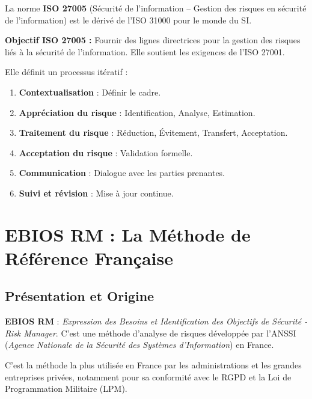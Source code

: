 La norme \textbf{ISO 27005} (Sécurité de l'information -- Gestion des risques en sécurité de l'information) est le dérivé de l'ISO 31000 pour le monde du SI.

\begin{boxdef}
\textbf{Objectif ISO 27005 :} Fournir des lignes directrices pour la gestion des risques liés à la sécurité de l'information. Elle soutient les exigences de l'ISO 27001.
\end{boxdef}

Elle définit un processus itératif :
\begin{enumerate}
    \item \textbf{Contextualisation} : Définir le cadre.
    \item \textbf{Appréciation du risque} : Identification, Analyse, Estimation.
    \item \textbf{Traitement du risque} : Réduction, Évitement, Transfert, Acceptation.
    \item \textbf{Acceptation du risque} : Validation formelle.
    \item \textbf{Communication} : Dialogue avec les parties prenantes.
    \item \textbf{Suivi et révision} : Mise à jour continue.
\end{enumerate}

\section{EBIOS RM : La Méthode de Référence Française}

\subsection{Présentation et Origine}

\begin{boxdef}
\textbf{EBIOS RM} : \textit{Expression des Besoins et Identification des Objectifs de Sécurité - Risk Manager}.
C'est une méthode d'analyse de risques développée par l'ANSSI (\textit{Agence Nationale de la Sécurité des Systèmes d'Information}) en France.
\end{boxdef}

C'est la méthode la plus utilisée en France par les administrations et les grandes entreprises privées, notamment pour sa conformité avec le RGPD et la Loi de Programmation Militaire (LPM).

